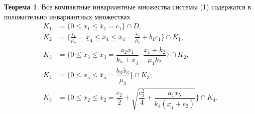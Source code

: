 \documentclass[12pt,a4paper]{extarticle}
\theoremstyle{definition}
\newtheorem{theorem}{Теорема}
\theoremstyle{definition}
\theoremstyle{definition}
\begin{document}
	\begin{theorem}
		Все компактные инвариантные множества системы (1) содержатся в положительно инвариантных множествах
		\begin{align*}
			K_1 &=\{0 \le x_1 \le \overline{x}_1 = c_1\}\cap D,\\
			K_2 &=\{\frac{s_1}{\mu_2} = \underline{x}_4 \le x_4 \le \overline{x}_4 = \frac{s_1}{\mu_2} + b_1c_1\}\cap K_1,\\
			K_3 &=\{0 \le x_3 \le \overline{x}_3 = \dfrac{a_2\overline{x}_1}{k_5+\underline{x}_4}\cdot\dfrac{\overline{x}_1+k_2}{\mu_1k_2}\}\cap K_2,\\
			K_4 &=\{0 \le x_5 \le \overline{x}_5 = \dfrac{b_3\overline{x}_3}{\mu_3}\}\cap K_3,\\
			K_5 &=\{0 \le x_2 \le \overline{x}_2 =  \dfrac{c_2}{2}+\sqrt{\dfrac{c_2^2}{4}+\dfrac{a_1\overline{x}_5}{k_4(\underline{x}_4+e_2)}}\}\cap K_4.
		\end{align*}
	\end{theorem}
\end{document}
